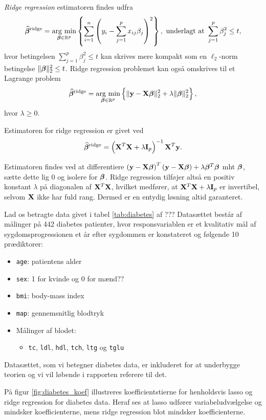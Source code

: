 \textit{Ridge regression} estimatoren findes udfra 
\begin{align} 
\widehat{\tbeta}^\text{ridge} = \argmin_{\tbeta \in \R^p} \cbr{\sum_{i=1}^n \del{y_i - \sum_{j=1}^p x_{ij} \beta_j}^2}, \ \text{underlagt at } \sum_{j=1}^p \beta_j^2 \leq t, \label{eq:2.7} 
\end{align} 
hvor betingelsen $\sum_{j=1}^p \beta_j^2 \leq t$ kan skrives mere kompakt som en \(\ell_2\)-norm betingelse $\Vert \boldsymbol{\beta} \Vert_2^2 \leq t$.
Ridge regression problemet kan også omskrives til et Lagrange problem
\begin{align*}
\widehat{\tbeta}^\text{ridge} = \argmin_{\tbeta \in \R^p} \cbr{ \Vert \y - \X \tbeta \Vert_2^2 + \lambda \Vert \tbeta \Vert_2^2},
\end{align*}
hvor $\lambda \geq 0$.
\begin{defn}
Estimatoren for ridge regression er givet ved
\begin{align} 
\widehat{\tbeta}^\text{ridge} = \del{\X^T \X + \lambda \mathbf{I}_p}^{-1} \X^T \y. \label{eq:ridge_estimator}
\end{align} 
\end{defn}
Estimatoren findes ved at differentiere \(\del{\y - \X \tbeta}^T \del{\y - \X \tbeta} + \lambda \tbeta^T \tbeta\) mht $\boldsymbol{\beta}$, sætte dette lig 0 og isolere for $\boldsymbol{\beta}$.
Ridge regression tilføjer altså en positiv konstant $\lambda$ på diagonalen af $\mathbf{X}^T \mathbf{X}$, hvilket medfører, at \(\mathbf{X}^T \mathbf{X} + \lambda \mathbf{I}_p\) er invertibel, selvom $\mathbf{X}$ ikke har fuld rang. 
Dermed er en entydig løsning altid garanteret. 
%
\begin{exmp}
Lad os betragte data givet i tabel \ref{tab:diabetes} af ???
Datasættet består af målinger på 442 diabetes patienter, hvor responsvariablen er et kvalitativ mål af sygdomsprogressionen et år efter sygdommen er konstateret og følgende 10 prædiktorer: 
\begin{itemize}
\item \texttt{age}: patientens alder
\item \texttt{sex}: 1 for kvinde og 0 for mænd??
\item \texttt{bmi}: body-mass index
\item \texttt{map}: gennemsnitlig blodtryk
\item Målinger af blodet:
\begin{itemize}
\item \texttt{tc},  \texttt{ldl}, \texttt{hdl}, \texttt{tch}, \texttt{ltg} og \texttt{tglu}
\end{itemize}
\end{itemize}
%

%
Datasættet, som vi betegner diabetes data, er inkluderet for at underbygge teorien og vi vil løbende i rapporten referere til det.
\end{exmp}
%
På figur \ref{fig:diabetes_koef} illustreres koefficientstierne for henholdsvis lasso og ridge regression for diabetes data.
Heraf ses at lasso udfører variabeludvælgelse og mindsker koefficienterne, mens ridge regression blot mindsker koefficienterne.
%

